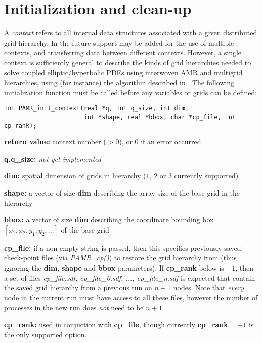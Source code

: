 \documentclass[aps,amssymb,unsortedaddress,nofootinbib]{revtex4}
\def\lsep{\itemsep 0.05in}
\begin{document}
\section{Initialization and clean-up}
A {\em context} refers to all internal data structures associated with a given
distributed grid hierarchy. In the future support may be added for the use
of multiple contexts, and transferring data between different contexts. However,
a single context is sufficiently general to describe the kinds of grid 
hierarchies needed to solve coupled elliptic/hyperbolic PDEs using interwoven
AMR and multigrid hierarchies, using (for instance) the algorithm described in \cite{fpthesis}.
The following initialization function must be called before any variables or
grids can be defined:


\begin{verbatim}
int PAMR_init_context(real *q, int q_size, int dim, 
                      int *shape, real *bbox, char *cp_file, int cp_rank);
\end{verbatim}

\begin{list}{}{\lsep}
\item {\bf return value:} context number ($>0$), or $0$ if an error occurred. 
\item {\bf q,q\_size:} {\em not yet implemented} 
\item {\bf dim:} spatial dimension of grids in hierarchy ($1$, $2$ or $3$ currently supported) 
\item {\bf *shape:} a vector of size {\bf dim} describing the array size of the base grid in the hierarchy 
\item {\bf *bbox:} a vector of size {\bf dim} describing the coordinate bounding box $[x_1,x_2,y_1,y_2,...]$ of the base grid
\item {\bf cp\_file:} if a non-empty string is passed, then this
specifies previously saved check-point files (via {\em PAMR\_cp()})
to restore the
grid hierarchy from (thus ignoring the {\bf dim}, {\bf shape} and
{\bf bbox} parameters). If {\bf cp\_rank} below is $-1$, then
a set of files {\em cp\_file.sdf, cp\_file\_0.sdf, ..., cp\_file\_n.sdf} 
is expected that contain
the saved grid hierarchy from a previous run on $n+1$ nodes. Note
that {\em every} node in the current run must have access to all
these files, however the number of processes in the new run does {\em not}
need to be $n+1$.
\item {\bf cp\_rank:} used in conjuction with {\bf cp\_file}, though
currently {\bf cp\_rank}$=-1$ is the only supported option.
\end{list}
\end{document}
